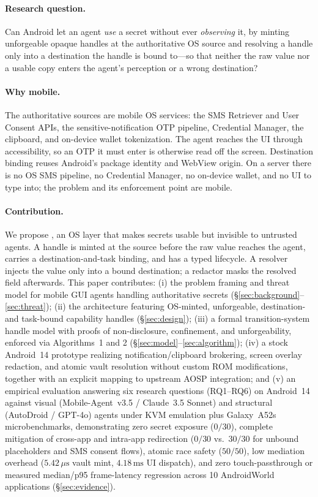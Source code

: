 \paragraph{Research question.} Can Android let an agent \emph{use} a secret without ever \emph{observing} it, by minting unforgeable opaque handles at the authoritative OS source and resolving a handle only into a destination the handle is bound to---so that neither the raw value nor a usable copy enters the agent's perception or a wrong destination?

\paragraph{Why mobile.} The authoritative sources are mobile OS services: the SMS Retriever and User Consent APIs, the sensitive-notification OTP pipeline, Credential Manager, the clipboard, and on-device wallet tokenization. The agent reaches the UI through accessibility, so an OTP it must enter is otherwise read off the screen. Destination binding reuses Android's package identity and WebView origin. On a server there is no OS SMS pipeline, no Credential Manager, no on-device wallet, and no UI to type into; the problem and its enforcement point are mobile.

\paragraph{Contribution.} We propose \SH, an OS layer that makes secrets usable but invisible to untrusted agents. A handle is minted at the source before the raw value reaches the agent, carries a destination-and-task binding, and has a typed lifecycle. A resolver injects the value only into a bound destination; a redactor masks the resolved field afterwards. This paper contributes: (i) the problem framing and threat model for mobile GUI agents handling authoritative secrets (\S\ref{sec:background}--\ref{sec:threat}); (ii) the \SH{} architecture featuring OS-minted, unforgeable, destination- and task-bound capability handles (\S\ref{sec:design}); (iii) a formal transition-system handle model with proofs of non-disclosure, confinement, and unforgeability, enforced via Algorithms~1 and 2 (\S\ref{sec:model}--\ref{sec:algorithm}); (iv) a stock Android~14 prototype realizing notification/clipboard brokering, screen overlay redaction, and atomic vault resolution without custom ROM modifications, together with an explicit mapping to upstream AOSP integration; and (v) an empirical evaluation answering six research questions (RQ1--RQ6) on Android~14 against visual (Mobile-Agent~v3.5 / Claude~3.5 Sonnet) and structural (AutoDroid / GPT-4o) agents under KVM emulation plus Galaxy~A52s microbenchmarks, demonstrating zero secret exposure ($0/30$), complete mitigation of cross-app and intra-app redirection ($0/30$ vs.\ $30/30$ for unbound placeholders and SMS consent flows), atomic race safety ($50/50$), low mediation overhead ($5.42\,\mu\text{s}$ vault mint, $4.18\,\text{ms}$ UI dispatch), and zero touch-passthrough or measured median/p95 frame-latency regression across 10 AndroidWorld applications (\S\ref{sec:evidence}).

